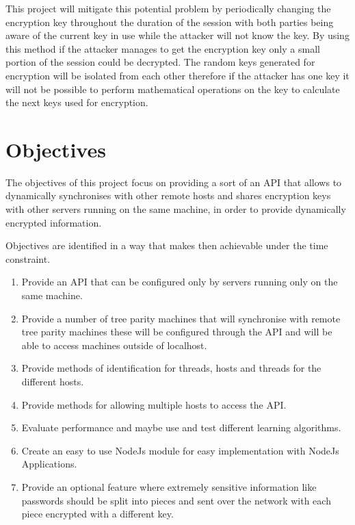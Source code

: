 This project will mitigate this potential problem by periodically changing the encryption key throughout the duration of the session with both parties being aware of the current key in use while the attacker will not know the key. By using this method if the attacker manages to get the encryption key only a small portion of the session could be decrypted. The random keys generated for encryption will be isolated from each other therefore if the attacker has one key it will not be possible to perform mathematical operations on the key to calculate the next keys used for encryption. 

\section{Objectives}
The objectives of this project focus on providing a sort of an API that allows to dynamically synchronises with other remote hosts and shares encryption keys with other servers running on the same machine, in order to provide dynamically encrypted information.

Objectives are identified in a way that makes then achievable under the time constraint.

\begin{enumerate}
	\item Provide an API that can be configured only by servers running only on the same machine.
	\item Provide a number of tree parity machines that will synchronise with remote tree parity machines these will be configured through the API and will be able to access machines outside of localhost.
	\item Provide methods of identification for threads, hosts and threads for the different hosts.
	\item Provide methods for allowing multiple hosts to access the API.
	\item Evaluate performance and maybe use and test different learning algorithms.
	\item Create an easy to use NodeJs module for easy implementation with NodeJs Applications.
	\item Provide an optional feature where extremely sensitive information like passwords should be split into pieces and sent over the network with each piece encrypted with a different key. 
\end{enumerate}

